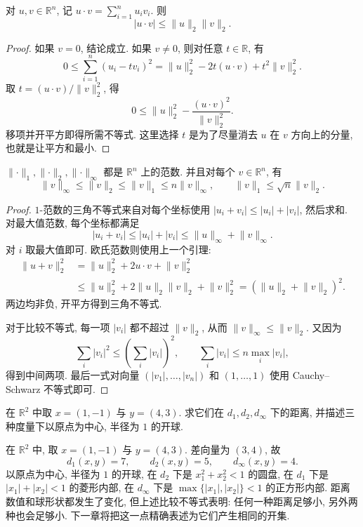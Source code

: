 \begin{lemma}\label{ch:metric:cs}
对 $u,v\in\mathbb{R}^n$, 记 $u\cdot v=\sum_{i=1}^nu_iv_i$. 则
\[
 |u\cdot v|\le\lVert u\rVert_2\lVert v\rVert_2.
\]
\end{lemma}
\begin{proof}
如果 $v=0$, 结论成立. 如果 $v\ne0$, 则对任意 $t\in\mathbb{R}$, 有
\[
 0\le\sum_{i=1}^n(u_i-tv_i)^2
 =\lVert u\rVert_2^2-2t(u\cdot v)+t^2\lVert v\rVert_2^2.
\]
取 $t=(u\cdot v)/\lVert v\rVert_2^2$, 得
\[
 0\le\lVert u\rVert_2^2-
 \frac{(u\cdot v)^2}{\lVert v\rVert_2^2}.
\]
移项并开平方即得所需不等式. 这里选择 $t$ 是为了尽量消去 $u$ 在 $v$ 方向上的分量, 也就是让平方和最小.
\end{proof}

\begin{proposition}\label{ch:metric:three-norms}
$\lVert\cdot\rVert_1,\lVert\cdot\rVert_2,\lVert\cdot\rVert_\infty$ 都是 $\mathbb{R}^n$ 上的范数. 并且对每个 $v\in\mathbb{R}^n$, 有
\[
 \lVert v\rVert_\infty\le\lVert v\rVert_2
 \le\lVert v\rVert_1\le n\lVert v\rVert_\infty,
 \qquad
 \lVert v\rVert_1\le\sqrt n\lVert v\rVert_2.
\]
\end{proposition}
\begin{proof}
$1$-范数的三角不等式来自对每个坐标使用 $|u_i+v_i|\le|u_i|+|v_i|$, 然后求和. 对最大值范数, 每个坐标都满足
\[
 |u_i+v_i|\le|u_i|+|v_i|
 \le\lVert u\rVert_\infty+\lVert v\rVert_\infty.
\]
对 $i$ 取最大值即可. 欧氏范数则使用上一个引理:
\begin{align*}
 \lVert u+v\rVert_2^2
 &=\lVert u\rVert_2^2+2u\cdot v+\lVert v\rVert_2^2\\
 &\le\lVert u\rVert_2^2+2\lVert u\rVert_2\lVert v\rVert_2
       +\lVert v\rVert_2^2
 =(\lVert u\rVert_2+\lVert v\rVert_2)^2.
\end{align*}
两边均非负, 开平方得到三角不等式.

对于比较不等式, 每一项 $|v_i|$ 都不超过 $\lVert v\rVert_2$, 从而 $\lVert v\rVert_\infty\le\lVert v\rVert_2$. 又因为
\[
 \sum_i|v_i|^2\le\left(\sum_i|v_i|\right)^2,
 \qquad
 \sum_i|v_i|\le n\max_i|v_i|,
\]
得到中间两项. 最后一式对向量 $(|v_1|,\ldots,|v_n|)$ 和 $(1,\ldots,1)$ 使用 Cauchy--Schwarz 不等式即可.
\end{proof}

\begin{example}
在 $\mathbb{R}^2$ 中取 $x=(1,-1)$ 与 $y=(4,3)$. 求它们在 $d_1,d_2,d_\infty$ 下的距离, 并描述三种度量下以原点为中心, 半径为 $1$ 的开球.
\end{example}
\begin{solution}
在 $\mathbb{R}^2$ 中, 取 $x=(1,-1)$ 与 $y=(4,3)$. 差向量为 $(3,4)$, 故
\[
 d_1(x,y)=7,\qquad d_2(x,y)=5,\qquad d_\infty(x,y)=4.
\]
以原点为中心, 半径为 $1$ 的开球, 在 $d_2$ 下是 $x_1^2+x_2^2<1$ 的圆盘, 在 $d_1$ 下是 $|x_1|+|x_2|<1$ 的菱形内部, 在 $d_\infty$ 下是 $\max\{|x_1|,|x_2|\}<1$ 的正方形内部. 距离数值和球形状都发生了变化, 但上述比较不等式表明: 任何一种距离足够小, 另外两种也会足够小. 下一章将把这一点精确表述为它们产生相同的开集.
\end{solution}

